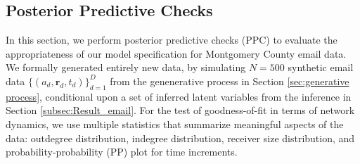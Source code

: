 \documentclass[ba]{imsart}
\def\spacingset#1{\renewcommand{\baselinestretch}%
	{#1}\small\normalsize} \spacingset{1}
\numberwithin{equation}{section}
\theoremstyle{plain}
\begin{document}
	\subsection{Posterior Predictive Checks}\label{subsec:PPC_email} 	   
In this section, we perform posterior predictive checks (PPC) \citep{rubin1984bayesianly} to evaluate the appropriateness of our model specification for Montgomery County email data. We formally generated entirely new data, by simulating $N=500$ synthetic email data $\{(a_{d}, \boldsymbol{r}_{d}, t_{d})\}_{d=1}^D$ from the genenerative process in Section \ref{sec:generative process}, conditional upon a set of inferred latent variables from the inference in Section \ref{subsec:Result_email}. For the test of goodness-of-fit in terms of network dynamics, we use multiple statistics that summarize meaningful aspects of the data: outdegree distribution, indegree distribution, receiver size distribution, and probability-probability (PP) plot for time increments. 

\end{document}
